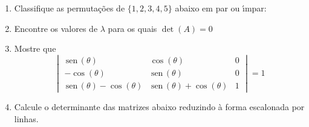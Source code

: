 \documentclass[a4paper,5pt]{amsbook}
\newcommand{\sen}{\,\mbox{sen}\,}
\begin{document}
\begin{enumerate}
	\vspace{0.5cm}
	\item Classifique as permuta\c{c}\~oes de $\{1, 2, 3, 4, 5\}$ abaixo em par ou
		\'{\i}mpar:


	\vspace{0.5cm}
	\item Encontre os valores de $\lambda$ para os quais $\det(A)=0$


	\vspace{0.5cm}
	\item Mostre que
		\[\begin{vmatrix}
			\sen(\theta) & \cos(\theta) & 0 \\
			-\cos(\theta) & \sen(\theta) & 0 \\
			\sen(\theta)-\cos(\theta) & \sen(\theta)+\cos(\theta) & 1
		\end{vmatrix}=1\]

	\vspace{0.5cm}
	\item Calcule o determinante das matrizes abaixo reduzindo \`a forma
		escalonada por linhas.


\end{enumerate}
\end{document}
